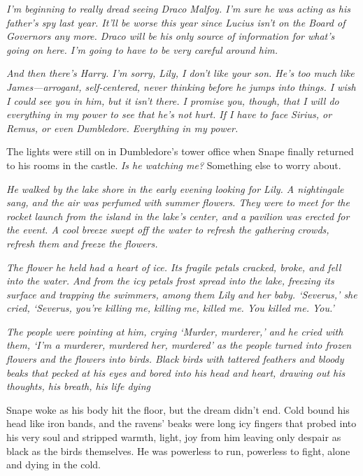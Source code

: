 \emph{I'm beginning to really dread seeing Draco Malfoy. I'm sure he was acting as his father's spy last year. It'll be worse this year since Lucius isn't on the Board of Governors any more. Draco will be his only source of information for what's going on here. I'm going to have to be very careful around him.}

\emph{And then there's Harry. I'm sorry, Lily, I don't like your son. He's too much like James—arrogant, self-centered, never thinking before he jumps into things. I wish I could see you in him, but it isn't there. I promise you, though, that I will do everything in my power to see that he's not hurt. If I have to face Sirius, or Remus, or even Dumbledore. Everything in my power.}

The lights were still on in Dumbledore's tower office when Snape finally returned to his rooms in the castle. \emph{Is he watching me?} Something else to worry about.

\sbreak

\emph{He walked by the lake shore in the early evening looking for Lily. A nightingale sang, and the air was perfumed with summer flowers. They were to meet for the rocket launch from the island in the lake's center, and a pavilion was erected for the event. A cool breeze swept off the water to refresh the gathering crowds, refresh them and freeze the flowers.}

\emph{The flower he held had a heart of ice. Its fragile petals cracked, broke, and fell into the water. And from the icy petals frost spread into the lake, freezing its surface and trapping the swimmers, among them Lily and her baby. `Severus,' she cried, `Severus, you're killing me, killing me, killed me. You killed me. You.'}

\emph{The people were pointing at him, crying `Murder, murderer,' and he cried with them, `I'm a murderer, murdered her, murdered{\el}' as the people turned into frozen flowers and the flowers into birds. Black birds with tattered feathers and bloody beaks that pecked at his eyes and bored into his head and heart, drawing out his thoughts, his breath, his life{\el} dying{\el}}

Snape woke as his body hit the floor, but the dream didn't end. Cold bound his head like iron bands, and the ravens' beaks were long icy fingers that probed into his very soul and stripped warmth, light, joy from him leaving only despair as black as the birds themselves. He was powerless to run, powerless to fight, alone and dying in the cold.


